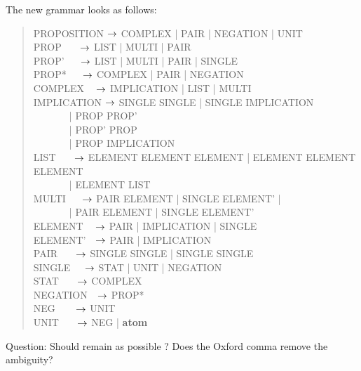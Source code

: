 \documentclass[a4paper]{article}
\begin{document}
The new grammar looks as follows:

\begin{quote}
\ttfamily
PROPOSITION $\rightarrow$ COMPLEX | PAIR | NEGATION | UNIT\\
PROP \(~~~~~~~\)$\rightarrow$ LIST | MULTI | PAIR\\
PROP' \(~~~~~~\)$\rightarrow$ LIST | MULTI | PAIR | SINGLE\\
PROP* \(~~~~~~\)$\rightarrow$ COMPLEX | PAIR | NEGATION\\
COMPLEX \(~~~~\)$\rightarrow$ IMPLICATION | LIST | MULTI\\
IMPLICATION $\rightarrow$ SINGLE  SINGLE
                    | SINGLE  IMPLICATION\\
\(~~~~~~~~~~~~~~~\) |
 PROP PROP'\\
\(~~~~~~~~~~~~~~~\) |
 PROP'  PROP\\
\(~~~~~~~~~~~~~~~\) |
 PROP  
IMPLICATION\\
LIST \(~~~~~~~\)$\rightarrow$ ELEMENT\txt{, } ELEMENT ELEMENT |
                      ELEMENT\txt{, } ELEMENT ELEMENT\\
\(~~~~~~~~~~~~~~~\) | ELEMENT\txt{, } LIST\\
MULTI \(~~~~~~\)$\rightarrow$ PAIR \: ELEMENT |
                      SINGLE  ELEMENT' |\\
\(~~~~~~~~~~~~~~~\) | PAIR  ELEMENT  |
                      SINGLE  ELEMENT'\\
ELEMENT \(~~~~\)$\rightarrow$ PAIR | IMPLICATION | SINGLE\\
ELEMENT' \(~~~\)$\rightarrow$ PAIR | IMPLICATION\\
PAIR \(~~~~~~~\)$\rightarrow$ SINGLE   SINGLE | SINGLE  SINGLE\\
SINGLE \(~~~~~\)$\rightarrow$ STAT | UNIT | NEGATION\\
STAT \(~~~~~~~\)$\rightarrow$ COMPLEX\\
NEGATION \(~~~\)$\rightarrow$ PROP*\\
NEG \(~~~~~~~~\)$\rightarrow$ UNIT\\
UNIT \(~~~~~~~\)$\rightarrow$ NEG | {\bf atom}\\
\end{quote}
Question: Should  remain as possible ? Does the 
Oxford comma remove the ambiguity?
\end{document}
